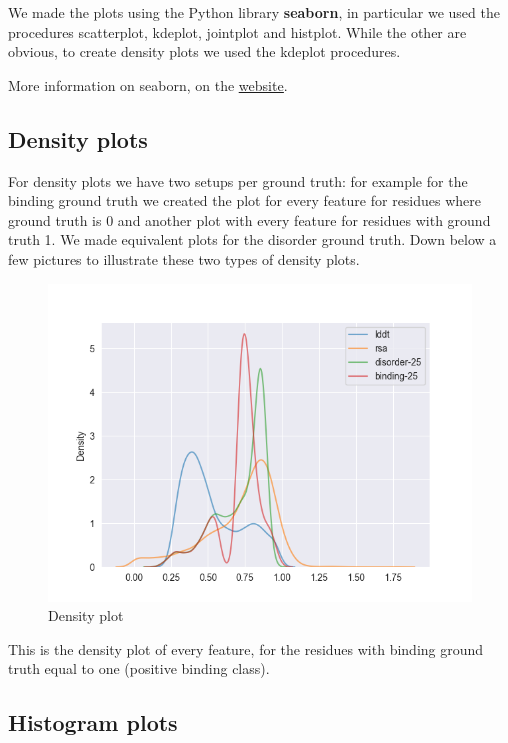 We made the plots using the Python library \textbf{seaborn}, in particular we used the procedures scatterplot, kdeplot, jointplot and histplot. While the other are obvious, to create density plots we used the kdeplot procedures.

More information on seaborn, on the \href{https://seaborn.pydata.org/}\underline{{website}}.

\vspace{10em}

\subsection{Density plots}
For density plots we have two setups per ground truth: for example for the binding ground truth we created the plot for every feature for residues where ground truth is 0 and another plot with every feature for residues with ground truth 1. We made equivalent plots for the disorder ground truth. Down below a few pictures to illustrate these two types of density plots.

\pagebreak

\begin{figure}[h!]
    
    \includegraphics[scale=0.9]{res/analysis/plots/bind1-density_all.png}
    \caption{Density plot}
\end{figure}

This is the density plot of every feature, for the residues with binding ground truth equal to one (positive binding class).

\subsection{Histogram plots}

